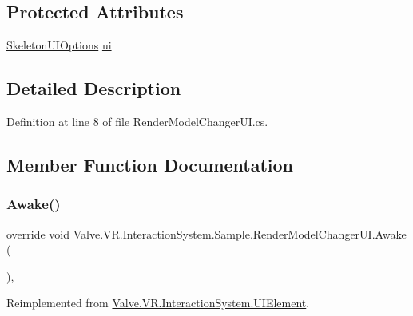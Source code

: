 \subsection*{Protected Attributes}
\begin{DoxyCompactItemize}
\item 
\mbox{\hyperlink{class_valve_1_1_v_r_1_1_interaction_system_1_1_sample_1_1_skeleton_u_i_options}{Skeleton\+U\+I\+Options}} \mbox{\hyperlink{class_valve_1_1_v_r_1_1_interaction_system_1_1_sample_1_1_render_model_changer_u_i_aba11aa37fc7200166c1d17719e4efdae}{ui}}
\end{DoxyCompactItemize}


\subsection{Detailed Description}


Definition at line 8 of file Render\+Model\+Changer\+U\+I.\+cs.



\subsection{Member Function Documentation}
\mbox{\label{class_valve_1_1_v_r_1_1_interaction_system_1_1_sample_1_1_render_model_changer_u_i_a67f90d46a8a14997ee227030d2d0c458}} 
\subsubsection{\texorpdfstring{Awake()}{Awake()}}
{\footnotesize\ttfamily override void Valve.\+V\+R.\+Interaction\+System.\+Sample.\+Render\+Model\+Changer\+U\+I.\+Awake (\begin{DoxyParamCaption}{ }\end{DoxyParamCaption})\hspace{0.3cm}{\ttfamily [protected]}, {\ttfamily [virtual]}}



Reimplemented from \mbox{\hyperlink{class_valve_1_1_v_r_1_1_interaction_system_1_1_u_i_element_a85ab59351314bba761c53a89f249e246}{Valve.\+V\+R.\+Interaction\+System.\+U\+I\+Element}}.




